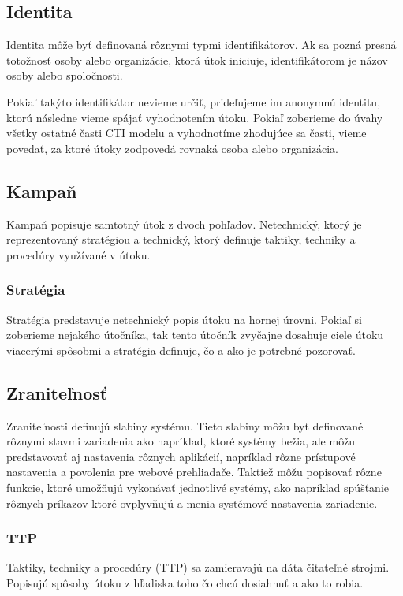 \documentclass[12pt, a4paper, oneside]{book}
\begin{document}
\subsection{Identita}
Identita môže byť definovaná rôznymi typmi identifikátorov. Ak sa pozná presná totožnosť osoby alebo organizácie, ktorá útok iniciuje, identifikátorom je názov osoby alebo spoločnosti.


Pokiaľ takýto identifikátor nevieme určiť, prideľujeme im anonymnú identitu, ktorú následne vieme spájať vyhodnotením útoku. Pokiaľ zoberieme do úvahy všetky ostatné časti CTI modelu a vyhodnotíme zhodujúce sa časti, vieme povedať, za ktoré útoky zodpovedá rovnaká osoba alebo organizácia.



\subsection{Kampaň}
Kampaň popisuje samtotný útok z dvoch pohľadov. Netechnický, ktorý je reprezentovaný stratégiou a technický, ktorý definuje taktiky, techniky a procedúry využívané v útoku.

\subsubsection{Stratégia}
Stratégia predstavuje netechnický popis útoku na hornej úrovni. Pokiaľ si zoberieme nejakého útočníka, tak tento útočník zvyčajne dosahuje ciele útoku viacerými spôsobmi a stratégia definuje, čo a ako je potrebné pozorovať.

\subsection{Zraniteľnosť}
Zraniteľnosti definujú slabiny systému. Tieto slabiny môžu byť definované rôznymi stavmi zariadenia ako napríklad, ktoré systémy bežia, ale môžu predstavovať aj nastavenia rôznych aplikácií, napríklad rôzne prístupové nastavenia a povolenia pre webové prehliadače. Taktiež môžu popisovať rôzne funkcie, ktoré umožňujú vykonávať jednotlivé systémy, ako napríklad spúšťanie rôznych príkazov ktoré ovplyvňujú a menia systémové nastavenia zariadenie.

\subsubsection{TTP}
Taktiky, techniky a procedúry (TTP) sa zamieravajú na dáta čitateľné strojmi. Popisujú spôsoby útoku z hľadiska toho čo chcú dosiahnuť a ako to robia.
\end{document}

